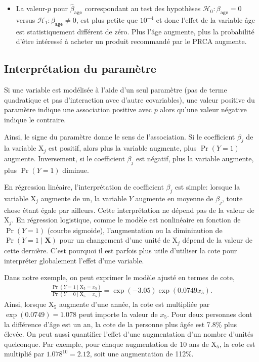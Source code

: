 \documentclass[
  11pt,
  letterpaper,
]{book}
\providecommand{\tightlist}{%
  \setlength{\itemsep}{0pt}\setlength{\parskip}{0pt}}\usepackage{longtable,booktabs,array}
\theoremstyle{definition}
\theoremstyle{remark}
\begin{document}
\begin{itemize}
\tightlist
\item
  La valeur-\(p\) pour \(\widehat{\beta}_{\texttt{age}}\) correspondant
  au test des hypothèses \(\mathscr{H}_0: \beta_{\texttt{age}}=0\)
  versus \(\mathscr{H}_1: \beta_{\texttt{age}} \neq 0\), est plus petite
  que \(10^{-4}\) et donc l'effet de la variable âge est statistiquement
  différent de zéro. Plus l'âge augmente, plus la probabilité d'être
  intéressé à acheter un produit recommandé par le PRCA augmente.
\end{itemize}

\hypertarget{interpruxe9tation-du-paramuxe8tre}{%
\subsection{Interprétation du
paramètre}\label{interpruxe9tation-du-paramuxe8tre}}

Si une variable est modélisée à l'aide d'un seul paramètre (pas de terme
quadratique et pas d'interaction avec d'autre covariables), une valeur
positive du paramètre indique une association positive avec \(p\) alors
qu'une valeur négative indique le contraire.

Ainsi, le signe du paramètre donne le sens de l'association. Si le
coefficient \(\beta_j\) de la variable \(\mathrm{X}_j\) est positif,
alors plus la variable augmente, plus \(\Pr(Y=1)\) augmente.
Inversement, si le coefficient \(\beta_j\) est négatif, plus la variable
augmente, plus \(\Pr(Y=1)\) diminue.

En régression linéaire, l'interprétation de coefficient \(\beta_j\) est
simple: lorsque la variable \(\mathrm{X}_j\) augmente de un, la variable
\(Y\) augmente en moyenne de \(\beta_j\), toute chose étant égale par
ailleurs. Cette interprétation ne dépend pas de la valeur de
\(\mathrm{X}_j\). En régression logistique, comme le modèle est
nonlinéaire en fonction de \(\Pr(Y=1)\) (courbe sigmoide),
l'augmentation ou la dimininution de \(\Pr(Y=1\mid \mathbf{X})\) pour un
changement d'une unité de \(\mathrm{X}_j\) dépend de la valeur de cette
dernière. C'est pourquoi il est parfois plus utile d'utiliser la cote
pour interpréter globalement l'effet d'une variable.

Dans notre exemple, on peut exprimer le modèle ajusté en termes de cote,
\begin{align*}
 \frac{\Pr(Y=1 \mid \mathrm{X}_5=x_5)}{\Pr(Y=0 \mid \mathrm{X}_5=x_5)} = \exp(-3.05)\exp(0.0749x_5).
\end{align*} Ainsi, lorsque \(\mathrm{X}_5\) augmente d'une année, la
cote est multipliée par \(\exp(0.0749) = 1.078\) peut importe la valeur
de \(x_5\). Pour deux personnes dont la différence d'âge est un an, la
cote de la personne plus âgée est 7.8\% plus élevée. On peut aussi
quantifier l'effet d'une augmentation d'un nombre d'unités quelconque.
Par exemple, pour chaque augmentation de 10 ans de \(\mathrm{X}_5\), la
cote est multiplié par \(1.078^{10} = 2.12\), soit une augmentation de
112\%.
\end{document}
